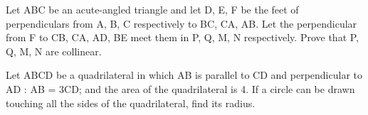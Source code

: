 \item Let ABC be an acute-angled triangle and let D, E, F be the feet of perpendiculars from A, B, C respectively to BC, CA, AB. Let the perpendicular from F to CB, CA, AD, BE meet them in P, Q, M, N respectively. Prove that P, Q, M, N are collinear.

\item Let ABCD be a quadrilateral in which AB is parallel to CD and perpendicular to AD : AB = 3CD; and the area of the quadrilateral is 4. If a circle can be drawn touching all the sides of the quadrilateral, find its radius.

